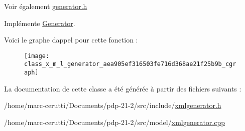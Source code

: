 \begin{DoxySeeAlso}{Voir également}
\hyperlink{generator_8h}{generator.\+h} 
\end{DoxySeeAlso}


Implémente \hyperlink{class_generator_a91197ce0544ad549cf3646957c33c0e9}{Generator}.

Voici le graphe d\textquotesingle{}appel pour cette fonction \+:\nopagebreak
\begin{figure}[H]
\begin{center}
\leavevmode
\texttt{[image: class\_x\_m\_l\_generator\_aea905ef316503fe716d368ae21f25b9b\_cgraph]}
\end{center}
\end{figure}


La documentation de cette classe a été générée à partir des fichiers suivants \+:\begin{DoxyCompactItemize}
\item 
/home/marc-\/cerutti/\+Documents/pdp-\/21-\/2/src/include/\hyperlink{xmlgenerator_8h}{xmlgenerator.\+h}\item 
/home/marc-\/cerutti/\+Documents/pdp-\/21-\/2/src/model/\hyperlink{xmlgenerator_8cpp}{xmlgenerator.\+cpp}\end{DoxyCompactItemize}

